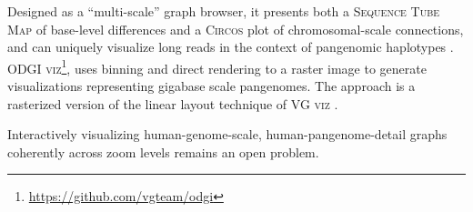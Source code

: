 Designed as a ``multi-scale'' graph browser, it presents both a \textsc{Sequence Tube Map} of base-level differences and a \textsc{Circos} \cite{Krzywinski_2009_Circos} plot of chromosomal-scale connections, and can uniquely visualize long reads in the context of pangenomic haplotypes \cite{yokoyama_momi-g:_2019}.
\textsc{ODGI viz}\footnote{\url{https://github.com/vgteam/odgi}}, uses binning and direct rendering to a raster image to generate visualizations representing gigabase scale pangenomes. %
The approach is a rasterized version of the linear layout technique of \textsc{VG viz} \citep{Garrison_2019}. %



Interactively visualizing human-genome-scale, human-pangenome-detail graphs coherently across zoom levels remains an open problem.



%

